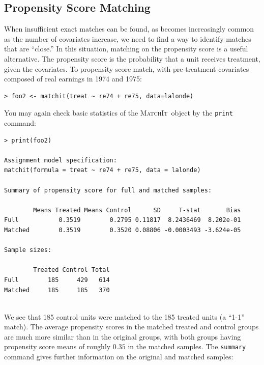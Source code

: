 \documentclass[oneside,letterpaper,titlepage]{article}
\newcommand{\MatchIt}{\textsc{MatchIt}}
\begin{document}
 
 



\subsection{Propensity Score Matching}
When insufficient exact matches can be found, as becomes
increasingly common as the number of covariates increase, we need to
find a way to identify matches that are ``close.''  In this situation,
matching on the propensity score is a useful alternative.  The
propensity score is the probability that a unit receives
treatment, given the covariates.  To propensity score
match, with pre-treatment covariates composed of real earnings in 1974
and 1975:

\begin{verbatim}
> foo2 <- matchit(treat ~ re74 + re75, data=lalonde)
\end{verbatim} 

\noindent You may again check basic statistics of the \MatchIt\ object by the
\texttt{print} command:

\begin{verbatim}
> print(foo2)
 
Assignment model specification:
matchit(formula = treat ~ re74 + re75, data = lalonde)
 
Summary of propensity score for full and matched samples:
 
        Means Treated Means Control      SD     T-stat       Bias
Full           0.3519        0.2795 0.11817  8.2436469  8.202e-01
Matched        0.3519        0.3520 0.08806 -0.0003493 -3.624e-05
 
Sample sizes:
 
        Treated Control Total
Full        185     429   614
Matched     185     185   370
 
\end{verbatim} 
We see that 185 control units were matched to the 185 treated units (a
``1-1'' match).  The average propensity scores in the matched treated
and control groups are much more similar than in the original groups,
with both groups having propensity score means of roughly $0.35$ in
the matched samples.  The {\tt summary} command gives further
information on the original and matched samples:
\end{document}
